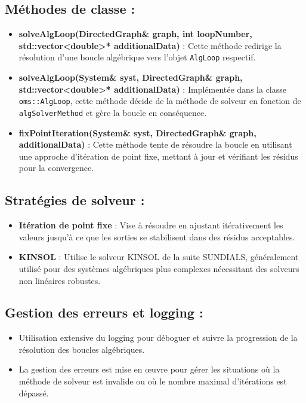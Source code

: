 \subsection*{Méthodes de classe :}
\begin{itemize}
    \item \textbf{solveAlgLoop(DirectedGraph\& graph, int loopNumber, std::vector<double>* additionalData)} : Cette méthode redirige la résolution d'une boucle algébrique vers l'objet \texttt{AlgLoop} respectif.
    \item \textbf{solveAlgLoop(System\& syst, DirectedGraph\& graph, std::vector<double>* additionalData)} : Implémentée dans la classe \texttt{oms::AlgLoop}, cette méthode décide de la méthode de solveur en fonction de \texttt{algSolverMethod} et gère la boucle en conséquence.
    \item \textbf{fixPointIteration(System\& syst, DirectedGraph\& graph, additionalData)} : Cette méthode tente de résoudre la boucle en utilisant une approche d'itération de point fixe, mettant à jour et vérifiant les résidus pour la convergence.

\end{itemize}

\subsection*{Stratégies de solveur :}
\begin{itemize}
    \item \textbf{Itération de point fixe} : Vise à résoudre en ajustant itérativement les valeurs jusqu'à ce que les sorties se stabilisent dans des résidus acceptables.
    \item \textbf{KINSOL} : Utilise le solveur KINSOL de la suite SUNDIALS, généralement utilisé pour des systèmes algébriques plus complexes nécessitant des solveurs non linéaires robustes.
\end{itemize}

\subsection*{Gestion des erreurs et logging :}
\begin{itemize}
    \item Utilisation extensive du logging pour déboguer et suivre la progression de la résolution des boucles algébriques.
    \item La gestion des erreurs est mise en œuvre pour gérer les situations où la méthode de solveur est invalide ou où le nombre maximal d'itérations est dépassé.
\end{itemize}

